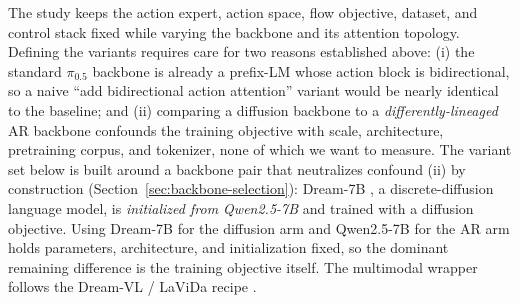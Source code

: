 \documentclass[11pt]{article}
\begin{document}
The study keeps the action expert, action space, flow objective, dataset, and control stack fixed while varying the backbone and its attention topology. Defining the variants requires care for two reasons established above: (i) the standard $\pi_{0.5}$ backbone is already a prefix-LM whose action block is bidirectional, so a naive ``add bidirectional action attention'' variant would be nearly identical to the baseline; and (ii) comparing a diffusion backbone to a \emph{differently-lineaged} AR backbone confounds the training objective with scale, architecture, pretraining corpus, and tokenizer, none of which we want to measure. The variant set below is built around a backbone pair that neutralizes confound (ii) by construction (Section~\ref{sec:backbone-selection}): Dream-7B \cite{dream}, a discrete-diffusion language model, is \emph{initialized from Qwen2.5-7B} \cite{qwen25} and trained with a diffusion objective. Using Dream-7B for the diffusion arm and Qwen2.5-7B for the AR arm holds parameters, architecture, and initialization fixed, so the dominant remaining difference is the training objective itself. The multimodal wrapper follows the Dream-VL / LaViDa recipe \cite{dreamvla,lavida}.
\end{document}

